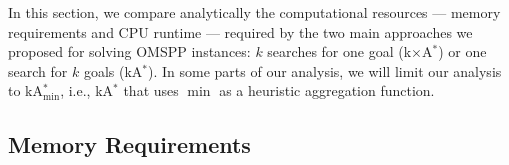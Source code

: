 \documentclass[smallextended]{svjour3}       %
\newcommand{\omspp}{\ac{OMSPP}\xspace}
\newcommand{\kastar}{kA$^*$\xspace}
\newcommand{\kastarvar}[1]{\textup{kA}$^*_{#1}$\xspace}
\newcommand{\kastarmin}{\kastarvar{\min}}
\newcommand{\kxastar}{k$\times$A$^*$\xspace}
\begin{document}
In this section, we compare analytically the computational resources --- memory requirements and CPU runtime --- required by the two main approaches we proposed for solving \omspp instances: $k$ searches for one goal (\kxastar) or one search for $k$ goals (\kastar). In some parts of our analysis, we will limit our analysis to \kastarmin, i.e., \kastar that uses $\min$ as a heuristic aggregation function. 








\subsection{Memory Requirements}
\end{document}
